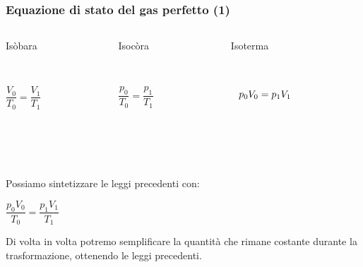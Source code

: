 \documentclass[]{beamer}
\theoremstyle{plain}
\begin{document}
\begin{frame}
\frametitle{Equazione di stato del gas perfetto (1)}
\begin{columns}
\begin{column}{0.3\textwidth}
\begin{center}
Isòbara

~

$ \dfrac{V_0}{T_0} = \dfrac{V_1}{T_1} $
\end{center}
\end{column}
\begin{column}{0.3\textwidth}
\begin{center}
Isocòra

~

$ \dfrac{p_0}{T_0} = \dfrac{p_1}{T_1} $
\end{center}
\end{column}
\begin{column}{0.3\textwidth}
\begin{center}
Isoterma

~

$ \textcolor{white}{\dfrac{a}{b}}p_0 V_0 = p_1 V_1 \textcolor{white}{\dfrac{a}{b}}$
\end{center}
\end{column}
\end{columns}\pause

~

~

Possiamo sintetizzare le leggi precedenti con:
\begin{center}
\colorbox{blue!30}{$ \dfrac{p_0 V_0}{T_0} = \dfrac{p_1 V_1}{T_1} $}
\end{center}\pause
Di volta in volta potremo semplificare la quantità che rimane costante durante la trasformazione, ottenendo le leggi precedenti.
\end{frame}
\end{document}
